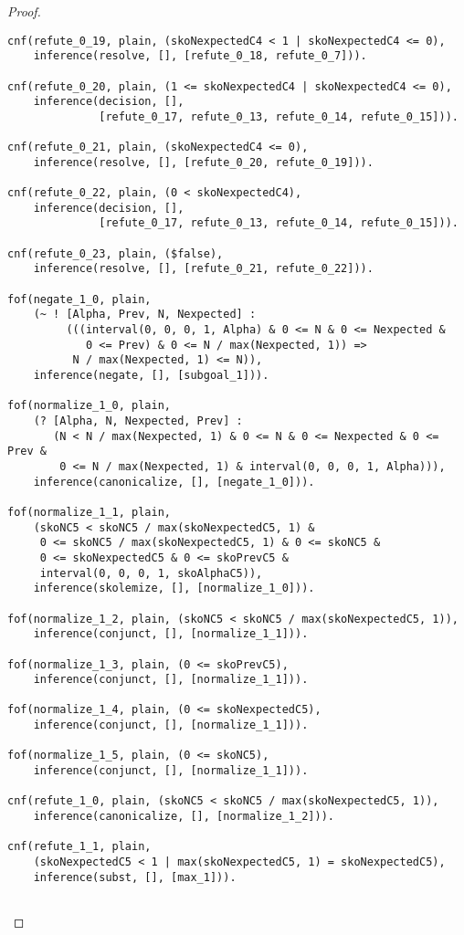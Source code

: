 \begin{proof}
\begin{verbatim}
cnf(refute_0_19, plain, (skoNexpectedC4 < 1 | skoNexpectedC4 <= 0),
    inference(resolve, [], [refute_0_18, refute_0_7])).

cnf(refute_0_20, plain, (1 <= skoNexpectedC4 | skoNexpectedC4 <= 0),
    inference(decision, [],
              [refute_0_17, refute_0_13, refute_0_14, refute_0_15])).

cnf(refute_0_21, plain, (skoNexpectedC4 <= 0),
    inference(resolve, [], [refute_0_20, refute_0_19])).

cnf(refute_0_22, plain, (0 < skoNexpectedC4),
    inference(decision, [],
              [refute_0_17, refute_0_13, refute_0_14, refute_0_15])).

cnf(refute_0_23, plain, ($false),
    inference(resolve, [], [refute_0_21, refute_0_22])).

fof(negate_1_0, plain,
    (~ ! [Alpha, Prev, N, Nexpected] :
         (((interval(0, 0, 0, 1, Alpha) & 0 <= N & 0 <= Nexpected &
            0 <= Prev) & 0 <= N / max(Nexpected, 1)) =>
          N / max(Nexpected, 1) <= N)),
    inference(negate, [], [subgoal_1])).

fof(normalize_1_0, plain,
    (? [Alpha, N, Nexpected, Prev] :
       (N < N / max(Nexpected, 1) & 0 <= N & 0 <= Nexpected & 0 <= Prev &
        0 <= N / max(Nexpected, 1) & interval(0, 0, 0, 1, Alpha))),
    inference(canonicalize, [], [negate_1_0])).

fof(normalize_1_1, plain,
    (skoNC5 < skoNC5 / max(skoNexpectedC5, 1) &
     0 <= skoNC5 / max(skoNexpectedC5, 1) & 0 <= skoNC5 &
     0 <= skoNexpectedC5 & 0 <= skoPrevC5 &
     interval(0, 0, 0, 1, skoAlphaC5)),
    inference(skolemize, [], [normalize_1_0])).

fof(normalize_1_2, plain, (skoNC5 < skoNC5 / max(skoNexpectedC5, 1)),
    inference(conjunct, [], [normalize_1_1])).

fof(normalize_1_3, plain, (0 <= skoPrevC5),
    inference(conjunct, [], [normalize_1_1])).

fof(normalize_1_4, plain, (0 <= skoNexpectedC5),
    inference(conjunct, [], [normalize_1_1])).

fof(normalize_1_5, plain, (0 <= skoNC5),
    inference(conjunct, [], [normalize_1_1])).

cnf(refute_1_0, plain, (skoNC5 < skoNC5 / max(skoNexpectedC5, 1)),
    inference(canonicalize, [], [normalize_1_2])).

cnf(refute_1_1, plain,
    (skoNexpectedC5 < 1 | max(skoNexpectedC5, 1) = skoNexpectedC5),
    inference(subst, [], [max_1])).


\end{verbatim}
\end{proof}
